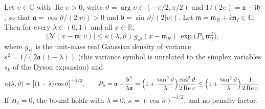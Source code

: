 \begin{lemma}
\label{lem:exactmfull-b0-domination}
Let \(\upsilon\in\mathbb C\) with \(\operatorname{Re}\upsilon>0\), write
\(\vartheta=\arg\upsilon\in(-\pi/2,\pi/2)\) and
\(1/(2\upsilon)=\mathfrak a-\mathrm i\mathfrak b\), so that
\(\mathfrak a=\cos\vartheta/(2|\upsilon|)>0\) and
\(\mathfrak b=\sin\vartheta/(2|\upsilon|)\).  Let
\(\mathfrak m=\mathfrak m_R+\mathrm i\mathfrak m_I\in\mathbb C\).  Then for
every \(\lambda\in(0,1)\) and all \(x\in\mathbb R\),
\begin{equation}
 \bigl|\mathcal N(x-\mathfrak m;\upsilon)\bigr|
 \le\kappa(\lambda,\vartheta)\,
 g_{s^2}(x-\mathfrak m_R)\,
 \exp\!\bigl(P_\lambda\,\mathfrak m_I^2\bigr),
 \label{eq:exactmfull-b0-domination}
\end{equation}
where \(g_{s^2}\) is the unit-mass real Gaussian density of variance
\(s^2=1/(2\mathfrak a(1-\lambda))\) (this variance symbol is unrelated to
the simplex variables \(s_k\) of the Dyson expansion) and
\begin{equation}
 \kappa(\lambda,\vartheta)
 =\bigl[(1-\lambda)\cos\vartheta\bigr]^{-1/2},
 \qquad
 P_\lambda
 =\mathfrak a+\frac{\mathfrak b^2}{\lambda\mathfrak a}
 =\Bigl(1+\frac{\tan^2\vartheta}{\lambda}\Bigr)
  \frac{\cos^2\vartheta}{2\operatorname{Re}\upsilon}
 \le\Bigl(1+\frac{\tan^2\vartheta}{\lambda}\Bigr)
  \frac{1}{2\operatorname{Re}\upsilon}.
 \label{eq:exactmfull-b0-kappaP}
\end{equation}
If \(\mathfrak m_I=0\), the bound holds with \(\lambda=0\),
\(\kappa=(\cos\vartheta)^{-1/2}\), and no penalty factor.
\end{lemma}

